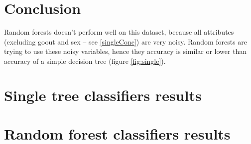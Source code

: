 \documentclass[a4paper]{article}
\begin{document}
\begin{multicols}{2}
\section{Conclusion}

Random forests doesn't perform well on this dataset, because
all attributes (excluding goout and sex -- see \ref{singleConc}) are very noisy.
Random forests are trying to use these noisy variables,
hence they accuracy is similar or lower than accuracy of
a simple decision tree (figure \ref{fig:single}).


\newpage
\appendix
\section{Single tree classifiers results}
\label{singleResults}


\newpage
\section{Random forest classifiers results}
\label{forestResults}




\end{multicols}
\end{document}
